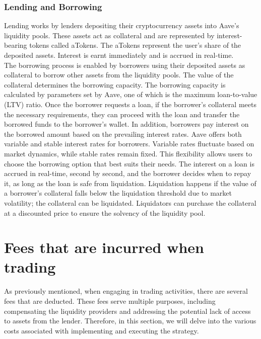\subsubsection{Lending and Borrowing}
Lending works by lenders depositing their cryptocurrency assets into Aave's liquidity pools. These assets act as collateral and are represented by interest-bearing tokens called aTokens. The aTokens represent the user's share of the deposited assets. Interest is earnt immediately and is accrued in real-time.
\\[3mm]
The borrowing process is enabled by borrowers using their deposited assets as collateral to borrow other assets from the liquidity pools. The value of the collateral determines the borrowing capacity. The borrowing capacity is calculated by parameters set by Aave, one of which is the maximum loan-to-value (LTV) ratio. Once the borrower requests a loan, if the borrower's collateral meets the necessary requirements, they can proceed with the loan and transfer the borrowed funds to the borrower's wallet. In addition, borrowers pay interest on the borrowed amount based on the prevailing interest rates. Aave offers both variable and stable interest rates for borrowers. Variable rates fluctuate based on market dynamics, while stable rates remain fixed. This flexibility allows users to choose the borrowing option that best suits their needs. The interest on a loan is accrued in real-time, second by second, and the borrower decides when to repay it, as long as the loan is safe from liquidation. Liquidation happens if the value of a borrower's collateral falls below the liquidation threshold due to market volatility; the collateral can be liquidated. Liquidators can purchase the collateral at a discounted price to ensure the solvency of the liquidity pool.

\section{Fees that are incurred when trading}
As previously mentioned, when engaging in trading activities, there are several fees that are deducted. These fees serve multiple purposes, including compensating the liquidity providers and addressing the potential lack of access to assets from the lender. Therefore, in this section, we will delve into the various costs associated with implementing and executing the strategy.

